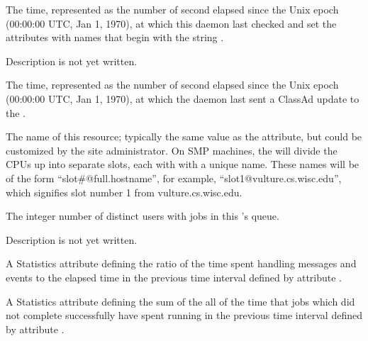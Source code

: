 \begin{description}
\item[\AdAttr{MonitorSelfTime}:] The  time, represented as the number of
  second elapsed since the Unix epoch (00:00:00 UTC, Jan 1, 1970),
  at which this daemon last checked and set the attributes with names that
  begin with the string .
  
\item[\AdAttr{MyAddress}:] Description is not yet written.

\item[\AdAttr{MyCurrentTime}:]  The time, represented as the number of 
  second elapsed since the Unix epoch (00:00:00 UTC, Jan 1, 1970),
  at which the  daemon last sent a ClassAd update to the
  .

\item[\AdAttr{Name}:] The name of this resource; typically the same value as
  the  attribute, but could be customized by the site
  administrator.
  On SMP machines, the  will divide the CPUs up into separate
  slots, each with with a unique name.
  These names will be of the form ``slot\#@full.hostname'', for example,
  ``slot1@vulture.cs.wisc.edu'', which signifies slot number 1 from
  vulture.cs.wisc.edu.

\item[\AdAttr{NumUsers}:] The integer number of distinct users with jobs in
  this 's queue.

\item[\AdAttr{PublicNetworkIpAddr}:] Description is not yet written.

\item[\AdAttr{RecentDaemonCoreDutyCycle}:] A Statistics attribute defining
  the ratio of the time spent 
  handling messages and events to the elapsed time 
  in the previous time interval defined by attribute .

\item[\AdAttr{RecentJobsAccumBadputTime}:] A Statistics attribute defining
  the sum of the all of the time that jobs which did not complete successfully 
  have spent running 
  in the previous time interval defined by attribute .



\end{description}
